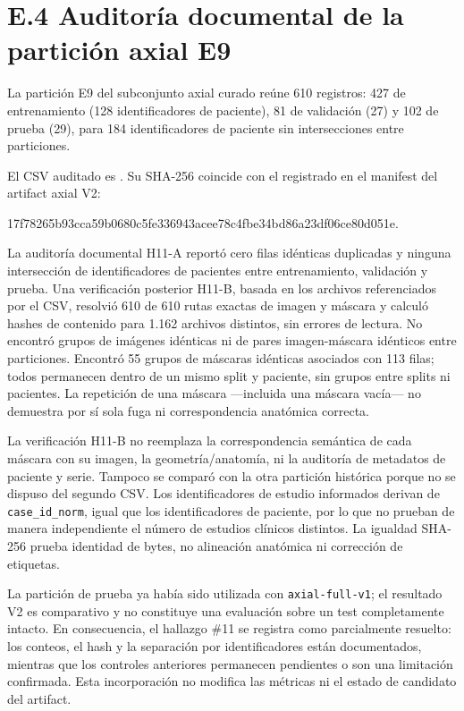\section*{E.4 Auditoría documental de la partición axial E9}
\label{anexo:entrenamiento-e4-auditoria-e9}

La partición E9 del subconjunto axial curado reúne 610 registros: 427 de entrenamiento (128 identificadores de paciente), 81 de validación (27) y 102 de prueba (29), para 184 identificadores de paciente sin intersecciones entre particiones.

El CSV auditado es . Su SHA-256 coincide con el registrado en el manifest del artifact axial V2:

{\small\ttfamily 17f78265\allowbreak b93cca59\allowbreak b0680c5f\allowbreak e336943a\allowbreak cee78c4f\allowbreak be34bd86\allowbreak a23df06c\allowbreak e80d051e}.

La auditoría documental H11-A reportó cero filas idénticas duplicadas y ninguna intersección de identificadores de pacientes entre entrenamiento, validación y prueba. Una verificación posterior H11-B, basada en los archivos referenciados por el CSV, resolvió 610 de 610 rutas exactas de imagen y máscara y calculó hashes de contenido para 1.162 archivos distintos, sin errores de lectura. No encontró grupos de imágenes idénticas ni de pares imagen-máscara idénticos entre particiones. Encontró 55 grupos de máscaras idénticas asociados con 113 filas; todos permanecen dentro de un mismo split y paciente, sin grupos entre splits ni pacientes. La repetición de una máscara —incluida una máscara vacía— no demuestra por sí sola fuga ni correspondencia anatómica correcta.

La verificación H11-B no reemplaza la correspondencia semántica de cada máscara con su imagen, la geometría/anatomía, ni la auditoría de metadatos de paciente y serie. Tampoco se comparó con la otra partición histórica porque no se dispuso del segundo CSV. Los identificadores de estudio informados derivan de \texttt{case\_id\_norm}, igual que los identificadores de paciente, por lo que no prueban de manera independiente el número de estudios clínicos distintos. La igualdad SHA-256 prueba identidad de bytes, no alineación anatómica ni corrección de etiquetas.

La partición de prueba ya había sido utilizada con \texttt{axial-full-v1}; el resultado V2 es comparativo y no constituye una evaluación sobre un test completamente intacto. En consecuencia, el hallazgo \#11 se registra como parcialmente resuelto: los conteos, el hash y la separación por identificadores están documentados, mientras que los controles anteriores permanecen pendientes o son una limitación confirmada. Esta incorporación no modifica las métricas ni el estado de candidato del artifact.

